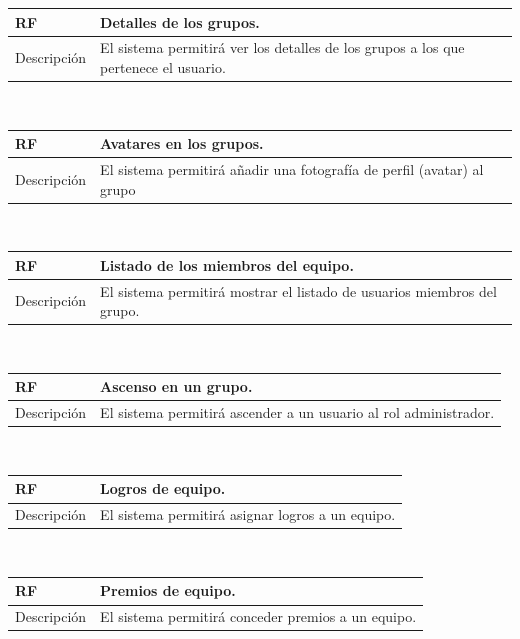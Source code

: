 \documentclass[twoside]{report}
\newcommand\addrow[2]{#1 &#2\\ }
\newcommand\addheading[2]{#1 &#2\\ \hline}
\newcommand\tabularhead{\begin{tabular}{lp{0.7\textwidth}}
\hline
}
\newenvironment{req}{\tabularhead}
{\hline\end{tabular}}
\begin{document}
\vspace{0.25cm}

\begin{req}
	\addheading{\textbf{RF\arabic{functionalRequirements}}}{Detalles de los grupos.}
	\addrow{Descripción}{El sistema permitirá ver los detalles de los grupos a los que pertenece el usuario.}
\end{req}\\

\vspace{0.25cm}

\begin{req}
	\addheading{\textbf{RF\arabic{functionalRequirements}}}{Avatares en los grupos.}
	\addrow{Descripción}{El sistema permitirá añadir una fotografía de perfil (avatar) al grupo}
\end{req}\\

\vspace{0.25cm}

\begin{req}
	\addheading{\textbf{RF\arabic{functionalRequirements}}}{Listado de los miembros del equipo.}
	\addrow{Descripción}{El sistema permitirá mostrar el listado de usuarios miembros del grupo. }
\end{req}\\

\vspace{0.25cm}

\begin{req}
	\addheading{\textbf{RF\arabic{functionalRequirements}}}{Ascenso en un grupo.}
	\addrow{Descripción}{El sistema permitirá ascender a un usuario al rol administrador. }
\end{req}\\

\begin{req}
	\addheading{\textbf{RF\arabic{functionalRequirements}}}{Logros de equipo.}
	\addrow{Descripción}{El sistema permitirá asignar logros a un equipo. }
\end{req}\\

\begin{req}
	\addheading{\textbf{RF\arabic{functionalRequirements}}}{Premios de equipo.}
	\addrow{Descripción}{El sistema permitirá conceder premios a un equipo.}
\end{req}\\
\end{document}

